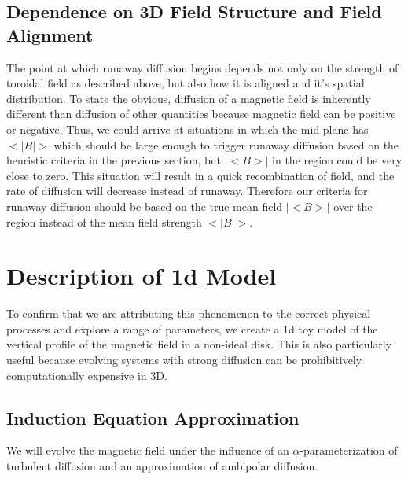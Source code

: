 \subsection{Dependence on 3D Field Structure and Field Alignment}
The point at which runaway diffusion begins depends not only on the strength of toroidal field as described above, but also how it is aligned and it's spatial distribution.  To state the obvious, diffusion of a magnetic field is inherently different than diffusion of other quantities because magnetic field can be positive or negative.  Thus, we could arrive at situations in which the mid-plane has $<|B|>$ which should be large enough to trigger runaway diffusion based on the heuristic criteria in the previous section, but $|<B>|$ in the region could be very close to zero.  This situation will result in a quick recombination of field, and the rate of diffusion will decrease instead of runaway.  Therefore our criteria for runaway diffusion should be based on the true mean field $|<B>|$ over the region instead of the mean field strength $<|B|>$.        






\newpage
\section{Description of 1d Model}
To confirm that we are attributing this phenomenon to the correct physical processes and explore a range of parameters, we create a 1d toy model of the vertical profile of the magnetic field in a non-ideal disk.  This is also particularly useful because evolving systems with strong diffusion can be prohibitively computationally expensive in 3D.  


\subsection{Induction Equation Approximation}
We will evolve the magnetic field under the influence of an $\alpha$-parameterization of turbulent diffusion and an approximation of ambipolar diffusion.  


